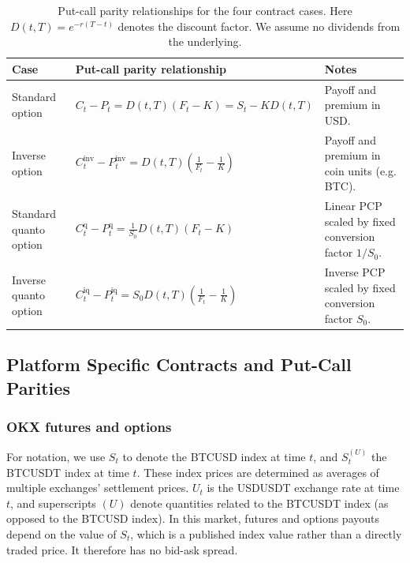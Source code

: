 \documentclass[12pt]{article}
\begin{document}
\begin{table}[!htbp]
\centering
\renewcommand{\arraystretch}{1.3}
\begin{tabularx}{\textwidth}{|>{\RaggedRight\arraybackslash}p{3.2cm}|>{\RaggedRight\arraybackslash}X|>{\RaggedRight\arraybackslash}p{4.0cm}|}
\hline
\textbf{Case} & \textbf{Put-call parity relationship} & \textbf{Notes} \\
\hline

Standard option
& $C_t-P_t = D(t,T)(F_t-K) = S_t-KD(t,T)$
& Payoff and premium in USD. \\
\hline

Inverse option
& $C_t^{\mathrm{inv}}-P_t^{\mathrm{inv}} = D(t,T)\left(\frac{1}{F_t}-\frac{1}{K}\right)$
& Payoff and premium in coin units (e.g. BTC). \\
\hline

Standard quanto option
& $C_t^{\mathrm{q}}-P_t^{\mathrm{q}} = \frac{1}{S_0}D(t,T)(F_t-K)$
& Linear PCP scaled by fixed conversion factor $1/S_0$. \\
\hline

Inverse quanto option
& $C_t^{\mathrm{iq}}-P_t^{\mathrm{iq}} = S_0D(t,T)\left(\frac{1}{F_t}-\frac{1}{K}\right)$
& Inverse PCP scaled by fixed conversion factor $S_0$. \\
\hline

\end{tabularx}
\caption{Put-call parity relationships for the four contract cases. Here $D(t,T)=e^{-r(T-t)}$ denotes the discount factor. We assume no dividends from the underlying.}
\label{pcp_four_cases}
\end{table}


\subsection{Platform Specific Contracts and Put-Call Parities}

\subsubsection{OKX futures and options}

For notation, we use $S_t$ to denote the BTCUSD index at time $t$, and $S^{(U)}_t$ the BTCUSDT index at time $t$. These index prices are determined as averages of multiple exchanges' settlement prices. $U_t$ is the USDUSDT exchange rate at time $t$, and superscripts $(U)$ denote quantities related to the BTCUSDT index (as opposed to the BTCUSD index). In this market, futures and options payouts depend on the value of $S_t$, which is a published index value rather than a directly traded price. It therefore has no bid-ask spread.
\end{document}
